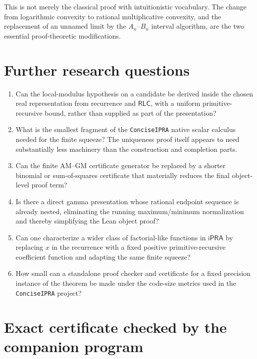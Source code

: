 \documentclass[11pt]{article}
\newcommand{\ipra}{\mathsf{iPRA}}
\newcommand{\RLC}{\mathsf{RLC}}
\newcommand{\code}[1]{\texttt{#1}}
\begin{document}
This is not merely the classical proof with intuitionistic vocabulary.  The
change from logarithmic convexity to rational multiplicative convexity, and
the replacement of an unnamed limit by the $A_n$--$B_n$ interval algorithm,
are the two essential proof-theoretic modifications.

\section{Further research questions}

\begin{enumerate}
\item Can the local-modulus hypothesis on a candidate be derived inside the
chosen real representation from recurrence and $\RLC$, with a uniform
primitive-recursive bound, rather than supplied as part of the presentation?

\item What is the smallest fragment of the \code{ConciseIPRA} native scalar
calculus needed for the finite squeeze?  The uniqueness proof itself appears
to need substantially less machinery than the construction and completion
parts.

\item Can the finite AM--GM certificate generator be replaced by a shorter
binomial or sum-of-squares certificate that materially reduces the final
object-level proof term?

\item Is there a direct gamma presentation whose rational endpoint sequence is
already nested, eliminating the running maximum/minimum normalization and
thereby simplifying the Lean object proof?

\item Can one characterize a wider class of factorial-like functions in
$\ipra$ by replacing $x$ in the recurrence with a fixed positive
primitive-recursive coefficient function and adapting the same finite squeeze?

\item How small can a standalone proof checker and certificate for a fixed
precision instance of the theorem be made under the code-size metrics used in
the \code{ConciseIPRA} project?
\end{enumerate}

\appendix
\section{Exact certificate checked by the companion program}
\end{document}
